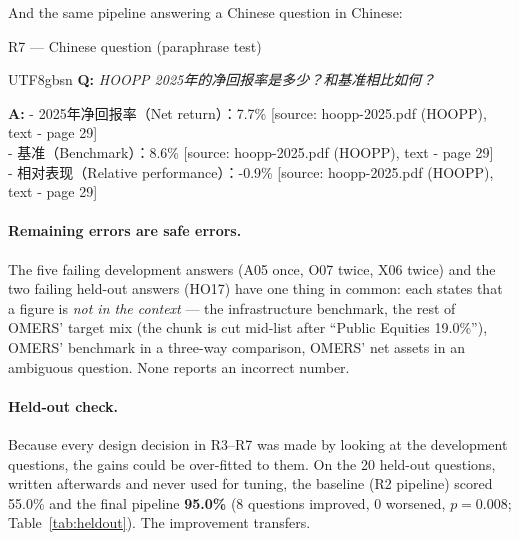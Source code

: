 \documentclass[11pt,a4paper]{article}
\newcommand{\Q}[1]{\noindent\textbf{Q:} \textit{#1}\par\smallskip}
\newcommand{\A}[1]{\noindent\textbf{A:} {\small\ttfamily #1}\par}
\begin{document}
\noindent And the same pipeline answering a Chinese question in Chinese:
\begin{qa}{R7 --- Chinese question (paraphrase test)}
\begin{CJK*}{UTF8}{gbsn}
\Q{HOOPP 2025年的净回报率是多少？和基准相比如何？}
\A{- 2025年净回报率（Net return）：7.7\% [source: hoopp-2025.pdf (HOOPP), text - page 29]\\
- 基准（Benchmark）：8.6\% [source: hoopp-2025.pdf (HOOPP), text - page 29]\\
- 相对表现（Relative performance）：-0.9\% [source: hoopp-2025.pdf (HOOPP), text - page 29]}
\end{CJK*}
\end{qa}

\paragraph{Remaining errors are safe errors.} The five failing development answers (A05 once, O07 twice, X06 twice)
and the two failing held-out answers (HO17) have one thing in common: each states that a figure is \emph{not in the
context} --- the infrastructure benchmark, the rest of OMERS' target mix (the chunk is cut mid-list after ``Public
Equities 19.0\%''), OMERS' benchmark in a three-way comparison, OMERS' net assets in an ambiguous question. None
reports an incorrect number.

\paragraph{Held-out check.} Because every design decision in R3--R7 was made by looking at the development
questions, the gains could be over-fitted to them. On the 20 held-out questions, written afterwards and never
used for tuning, the baseline (R2 pipeline) scored 55.0\% and the final pipeline \textbf{95.0\%} (8 questions improved,
0 worsened, $p=0.008$; Table~\ref{tab:heldout}). The improvement transfers.

\begin{table}[H]
\centering\small
\caption{Held-out evaluation: baseline vs final pipeline on 20 questions never used for design.}
\label{tab:heldout}

\end{table}

\end{document}
